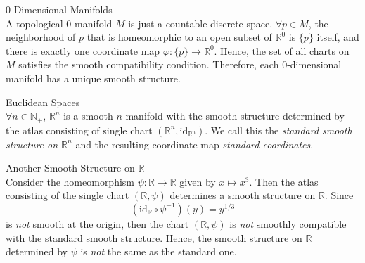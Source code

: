 \begin{example}{$0$-Dimensional Manifolds}\\
A topological $0$-manifold $M$ is just a countable discrete space. $\forall p\in M$, the neighborhood of $p$ that is homeomorphic to an open subset of $\mathbb{R}^0$ is $\{p\}$ itself, and there is exactly one coordinate map $\varphi:\{p\} \to \mathbb{R}^0$. Hence, the set of all charts on $M$ satisfies the smooth compatibility condition. Therefore, each $0$-dimensional manifold has a unique smooth structure.
\end{example}

\begin{example}{Euclidean Spaces}\\
$\forall n\in \mathbb{N}_+$, $\mathbb{R}^n$ is a smooth $n$-manifold with the smooth structure determined by the atlas consisting of single chart $(\mathbb{R}^n ,\text{id}_{\mathbb{R}^n})$. We call this the \textit{standard smooth structure on $\mathbb{R}^n$} and the resulting coordinate map \textit{standard coordinates}.
\end{example}

\begin{example}{Another Smooth Structure on $\mathbb{R}$}\\
Consider the homeomorphism $\psi:\mathbb{R} \to \mathbb{R}$ given by $x\mapsto x^3$. Then the atlas consisting of the single chart $(\mathbb{R}, \psi)$ determines a smooth structure on $\mathbb{R}$. Since
\[
(\text{id}_\mathbb{R} \circ \psi^{-1}) (y)= y^{1/3}
\]
is \textit{not} smooth at the origin, then the chart $(\mathbb{R}, \psi)$ is \textit{not} smoothly compatible with the standard smooth structure. Hence, the smooth structure on $\mathbb{R}$ determined by $\psi$ is \textit{not} the same as the standard one.
\end{example}

